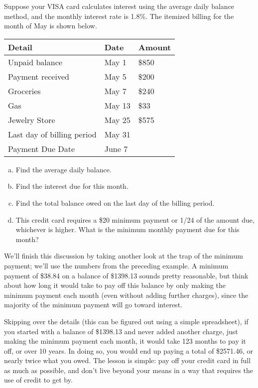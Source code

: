 \begin{try}
Suppose your VISA card calculates interest using the average daily balance method, and the monthly interest rate is 1.8\%.  The itemized billing for the month of May is shown below.
\begin{center}
\begin{tabular}{l l l}
Detail & Date & Amount\\
\hline
Unpaid balance & May 1 & \$850\\
Payment received & May 5 & \$200\\
Groceries & May 7 & \$240\\
Gas & May 13 & \$33\\
Jewelry Store & May 25 & \$575\\
Last day of billing period & May 31 &\\
Payment Due Date & June 7 &\\
\end{tabular}
\end{center}

\begin{enumerate}[(a)]
\item Find the average daily balance.
\item Find the interest due for this month.
\item Find the total balance owed on the last day of the billing period.
\item This credit card requires a \$20 minimum payment or 1/24 of the amount due, whichever is higher.  What is the minimum monthly payment due for this month?
\end{enumerate}
\end{try}

We'll finish this discussion by taking another look at the trap of the minimum payment; we'll use the numbers from the preceding example.  A minimum payment of \$38.84 on a balance of \$1398.13 sounds pretty reasonable, but think about how long it would take to pay off this balance by only making the minimum payment each month (even without adding further charges), since the majority of the minimum payment will go toward interest.

Skipping over the details (this can be figured out using a simple spreadsheet), if you started with a balance of \$1398.13 and never added another charge, just making the minimum payment each month, it would take 123 months to pay it off, or over 10 years.  In doing so, you would end up paying a total of \$2571.46, or nearly twice what you owed.  The lesson is simple: pay off your credit card in full as much as possible, and don't live beyond your means in a way that requires the use of credit to get by.